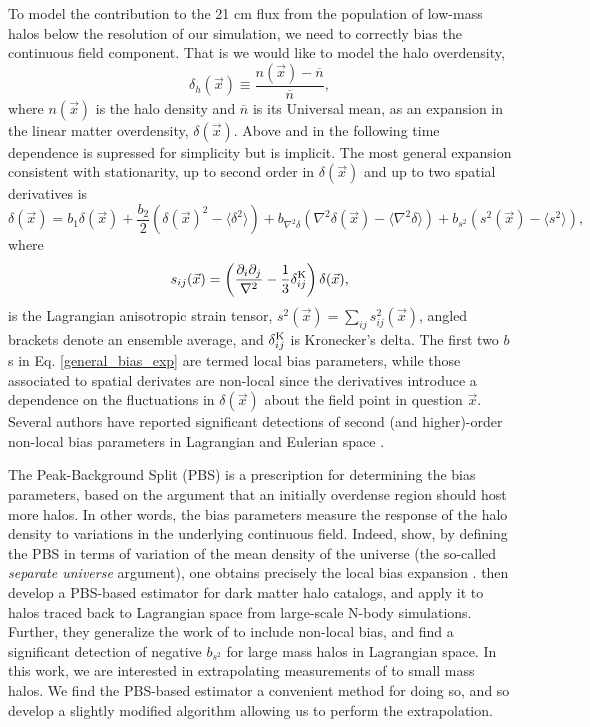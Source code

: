 To model the contribution to the 21 cm flux from the population of low-mass halos below the resolution of our simulation, we need to correctly bias the continuous field component. That is we would like to model the halo overdensity,
\begin{equation}
\delta_h(\vec{x}) \equiv \frac{n(\vec{x}) - \overline{n}}{\overline{n}},
\end{equation}
where $n(\vec{x})$ is the halo density and $\overline{n}$ is its Universal mean, as an expansion in the linear matter overdensity, $\delta(\vec{x})$. Above and in the following time dependence is supressed for simplicity but is implicit. The most general expansion consistent with stationarity, up to second order in $\delta(\vec{x})$ and up to two spatial derivatives is
\begin{equation}
\delta(\vec{x}) = b_1 \delta(\vec{x}) + \frac{b_2}{2} \left( \delta(\vec{x})^2 - \langle \delta^2 \rangle \right)+ b_{\nabla^2\delta} \left( \nabla^2\delta(\vec{x}) - \langle \nabla^2\delta \rangle \right) + b_{s^2} \left( s^2(\vec{x}) - \langle s^2 \rangle \right), \label{general_bias_exp}
\end{equation}
where
\begin{equation}
s_{ij}(\vec{x}) = \left( \frac{\partial_i \partial_j}{\nabla^2} - \frac{1}{3}\delta^{\rm K}_{ij}\right) \delta(\vec{x}),
\end{equation}
is the Lagrangian anisotropic strain tensor, $s^2(\vec{x}) = \sum_{ij} s^2_{ij}(\vec{x})$, angled brackets denote an ensemble average, and $\delta_{ij}^{\rm K}$ is Kronecker's delta. The first two $b$s in Eq. \ref{general_bias_exp} are termed local bias parameters, while those associated to spatial derivates are non-local since the derivatives introduce a dependence on the fluctuations in $\delta(\vec{x})$ about the field point in question $\vec{x}$. Several authors have reported significant detections of second (and higher)-order non-local bias parameters in Lagrangian \citep{shethetal2013, biagettietal2014, modietal2017, abidi+baldauf2018} and Eulerian space \cite{lazeyrasetal2017}.

The Peak-Background Split (PBS) is a prescription for determining the bias parameters, based on the argument that an initially overdense region should host more halos. In other words, the bias parameters measure the response of the halo density to variations in the underlying continuous field. Indeed, \citeauthor{schmidt2013} show, by defining the PBS in terms of variation of the mean density of the universe (the so-called \textit{separate universe} argument), one obtains precisely the local bias expansion \citep{biasreview}. \citeauthor{modietal2017} then develop a PBS-based estimator for dark matter halo catalogs, and apply it to halos traced back to Lagrangian space from large-scale N-body simulations. Further, they generalize the work of \citeauthor{schmidt2013} to include non-local bias, and find a significant detection of negative $b_{s^2}$ for large mass halos in Lagrangian space. In this work, we are interested in extrapolating measurements of  \citeauthor{modietal2017} to small mass halos. We find the PBS-based estimator a convenient method for doing so, and so develop a slightly modified algorithm allowing us to perform the extrapolation. 

